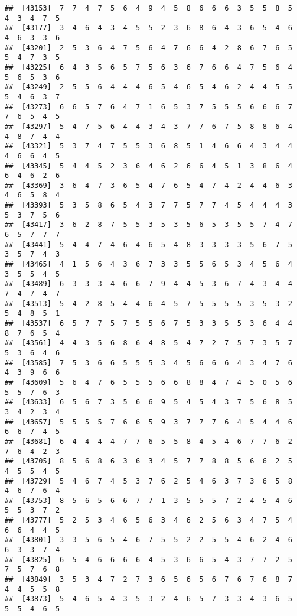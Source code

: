 \documentclass[
]{book}
\begin{document}
\begin{verbatim}
##  [43153]  7  7  4  7  5  6  4  9  4  5  8  6  6  6  3  5  5  8  5  4  3  4  7  5
##  [43177]  3  4  6  4  3  4  5  5  2  3  6  8  6  4  3  6  5  4  6  4  6  3  3  6
##  [43201]  2  5  3  6  4  7  5  6  4  7  6  6  4  2  8  6  7  6  5  5  4  7  3  5
##  [43225]  6  4  3  5  6  5  7  5  6  3  6  7  6  6  4  7  5  6  4  5  6  5  3  6
##  [43249]  2  5  5  6  4  4  4  6  5  4  6  5  4  6  2  4  4  5  5  5  4  6  3  7
##  [43273]  6  6  5  7  6  4  7  1  6  5  3  7  5  5  5  6  6  6  7  7  6  5  4  5
##  [43297]  5  4  7  5  6  4  4  3  4  3  7  7  6  7  5  8  8  6  4  4  8  7  4  4
##  [43321]  5  3  7  4  7  5  5  3  6  8  5  1  4  6  6  4  3  4  4  4  6  6  4  5
##  [43345]  5  4  4  5  2  3  6  4  6  2  6  6  4  5  1  3  8  6  4  6  4  6  2  6
##  [43369]  3  6  4  7  3  6  5  4  7  6  5  4  7  4  2  4  4  6  3  4  6  5  8  4
##  [43393]  5  3  5  8  6  5  4  3  7  7  5  7  7  4  5  4  4  4  3  5  3  7  5  6
##  [43417]  3  6  2  8  7  5  5  3  5  3  5  6  5  3  5  5  7  4  7  6  5  7  7  7
##  [43441]  5  4  4  7  4  6  4  6  5  4  8  3  3  3  3  5  6  7  5  3  5  7  4  3
##  [43465]  4  1  5  6  4  3  6  7  3  3  5  5  6  5  3  4  5  6  4  3  5  5  4  5
##  [43489]  6  3  3  3  4  6  6  7  9  4  4  5  3  6  7  4  3  4  4  7  4  7  4  7
##  [43513]  5  4  2  8  5  4  4  6  4  5  7  5  5  5  5  3  5  3  2  5  4  8  5  1
##  [43537]  6  5  7  7  5  7  5  5  6  7  5  3  3  5  5  3  6  4  4  8  7  6  5  4
##  [43561]  4  4  3  5  6  8  6  4  8  5  4  7  2  7  5  7  3  5  7  5  3  6  4  6
##  [43585]  7  5  3  6  6  5  5  5  3  4  5  6  6  6  4  3  4  7  6  4  3  9  6  6
##  [43609]  5  6  4  7  6  5  5  5  6  6  8  8  4  7  4  5  0  5  6  5  5  7  6  3
##  [43633]  6  5  6  7  3  5  6  6  9  5  4  5  4  3  7  5  6  8  5  3  4  2  3  4
##  [43657]  5  5  5  5  7  6  6  5  9  3  7  7  7  6  4  5  4  4  6  6  6  7  4  5
##  [43681]  6  4  4  4  4  7  7  6  5  5  8  4  5  4  6  7  7  6  2  7  6  4  2  3
##  [43705]  8  5  6  8  6  3  6  3  4  5  7  7  8  8  5  6  6  2  5  4  5  5  4  5
##  [43729]  5  4  6  7  4  5  3  7  6  2  5  4  6  3  7  3  6  5  8  4  6  7  6  4
##  [43753]  8  5  6  5  6  6  7  7  1  3  5  5  5  7  2  4  5  4  6  5  5  3  7  2
##  [43777]  5  2  5  3  4  6  5  6  3  4  6  2  5  6  3  4  7  5  4  6  6  4  4  5
##  [43801]  3  3  5  6  5  4  6  7  5  5  2  2  5  5  4  6  2  4  6  6  3  3  7  4
##  [43825]  6  5  4  6  6  6  6  4  5  3  6  6  5  4  3  7  7  2  5  7  5  7  6  8
##  [43849]  3  5  3  4  7  2  7  3  6  5  6  5  6  7  6  7  6  8  7  4  4  5  5  8
##  [43873]  5  4  6  5  4  3  5  3  2  4  6  5  7  3  3  4  3  6  5  5  5  4  6  5

\end{verbatim}
\end{document}
